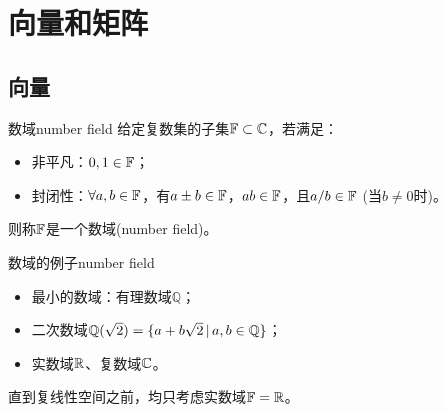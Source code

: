 \chapter{向量和矩阵}

\section{向量}

\begin{definition}
	{数域}{number field}
	给定复数集的子集$\mathbb F\subset\mathbb C$，若满足：
	\begin{itemize}
		\item 非平凡：$0,1\in\mathbb F$；
		\item 封闭性：$\forall a,b\in\mathbb F$，有$a\pm b\in\mathbb F$，$ab\in\mathbb F$，且$a/b\in\mathbb F$ (当$b\neq 0$时)。
	\end{itemize}
	则称$\mathbb F$是一个数域(number field)。
\end{definition}

\begin{example}
	{数域的例子}{number field}
	\begin{itemize}
		\item 最小的数域：有理数域$\mathbb Q$；
	
		\item 二次数域$\mathbb Q(\sqrt 2)=\{a+b\sqrt2\,|\,a,b\in\mathbb Q\}$；
	
		\item 实数域$\mathbb R$、复数域$\mathbb C$。
	\end{itemize}
\end{example}

\begin{remark}
	直到复线性空间之前，均只考虑实数域$\mathbb F=\mathbb R$。
\end{remark}

